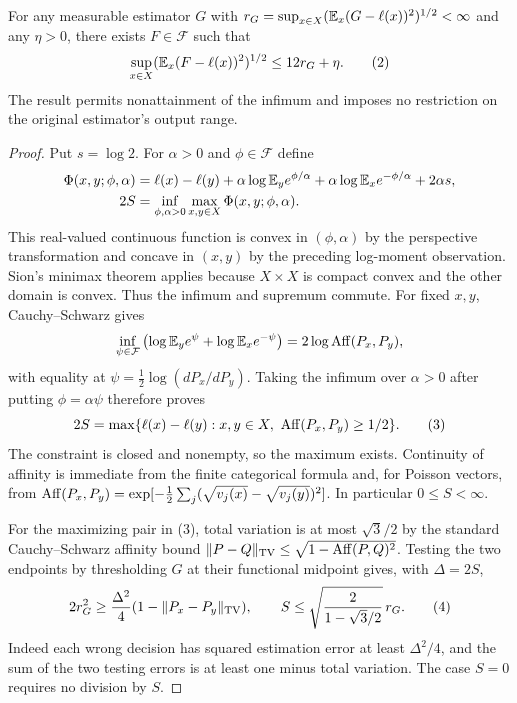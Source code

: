\begin{lemma}\label{lem:comparison}
For any measurable estimator $G$ with
$r_G=\sup_{x\in X}(\mathbb E_x(G-\ell(x))^2)^{1/2}<\infty$ and any $\eta>0$,
there exists $F\in\mathcal F$ such that
\[
 \sup_{x\in X}(\mathbb E_x(F-\ell(x))^2)^{1/2}\le12r_G+\eta.       \tag{2}
\]
The result permits nonattainment of the infimum and imposes no restriction
on the original estimator's output range.
\end{lemma}
\begin{proof}
Put $s=\log2$. For $\alpha>0$ and $\phi\in\mathcal F$ define
\begin{align*}
 \Phi(x,y;\phi,\alpha)
 &=\ell(x)-\ell(y)
   +\alpha\log\mathbb E_y e^{\phi/\alpha}
   +\alpha\log\mathbb E_x e^{-\phi/\alpha}+2\alpha s,\\
 2S&=\inf_{\phi,\alpha>0}\max_{x,y\in X}\Phi(x,y;\phi,\alpha).
\end{align*}
This real-valued continuous function is convex in $(\phi,\alpha)$ by the
perspective transformation and concave in $(x,y)$ by the preceding
log-moment observation. Sion's minimax theorem applies because $X\times X$
is compact convex and the other domain is convex. Thus the infimum and
supremum commute. For fixed $x,y$, Cauchy--Schwarz gives
\[
 \inf_{\psi\in\mathcal F}
  \left(\log\mathbb E_y e^\psi+\log\mathbb E_x e^{-\psi}\right)
   =2\log\operatorname{Aff}(P_x,P_y),
\]
with equality at $\psi=\tfrac12\log(dP_x/dP_y)$.
Taking the infimum over $\alpha>0$ after putting $\phi=\alpha\psi$
therefore proves
\[
 2S=\max\{\ell(x)-\ell(y):x,y\in X,\ \Aff(P_x,P_y)\ge1/2\}. \tag{3}
\]
The constraint is closed and nonempty, so the maximum exists. Continuity
of affinity is immediate from the finite categorical formula and, for
Poisson vectors, from
$\operatorname{Aff}(P_x,P_y)=\exp[-\tfrac12\sum_j(\sqrt{v_j(x)}-\sqrt{v_j(y)})^2]$.
In particular $0\le S<\infty$.

For the maximizing pair in (3), total variation is at most $\sqrt3/2$
by the standard Cauchy--Schwarz affinity bound
$\|P-Q\|_{\rm TV}\le\sqrt{1-\operatorname{Aff}(P,Q)^2}$.
Testing the two endpoints by thresholding $G$ at their functional midpoint
gives, with $\Delta=2S$,
\[
 2r_G^2\ge \frac{\Delta^2}{4}
           (1-\|P_x-P_y\|_{\rm TV}),\qquad
 S\le\sqrt{\frac{2}{1-\sqrt3/2}}\,r_G.                    \tag{4}
\]
Indeed each wrong decision has squared estimation error at least
$\Delta^2/4$, and the sum of the two testing errors is at least one minus
total variation. The case $S=0$ requires no division by $S$.


\end{proof}

